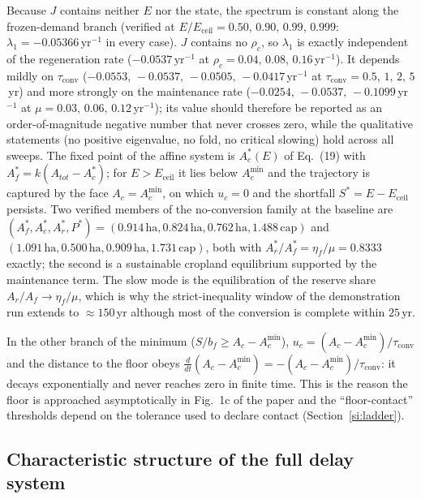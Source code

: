 \documentclass[11pt,a4paper]{article}
\newcommand{\Eceil}{E_{\mathrm{ceil}}}
\newcommand{\Acmin}{A_c^{\min}}
\newcommand{\tconv}{\tau_{\mathrm{conv}}}
\begin{document}
Because $J$ contains neither $E$ nor the state, the spectrum is constant along the frozen-demand branch (verified at $E/\Eceil=0.50,\,0.90,\,0.99,\,0.999$: $\lambda_1=-0.05366\,\mathrm{yr}^{-1}$ in every case). $J$ contains no $\rho_c$, so $\lambda_1$ is exactly independent of the regeneration rate ($-0.0537\,\mathrm{yr}^{-1}$ at $\rho_c=0.04,\,0.08,\,0.16$\,yr$^{-1}$). It depends mildly on $\tconv$ ($-0.0553,\,-0.0537,\,-0.0505,\,-0.0417$\,yr$^{-1}$ at $\tconv=0.5,\,1,\,2,\,5$\,yr) and more strongly on the maintenance rate ($-0.0254,\,-0.0537,\,-0.1099$\,yr$^{-1}$ at $\mu=0.03,\,0.06,\,0.12$\,yr$^{-1}$); its value should therefore be reported as an order-of-magnitude negative number that never crosses zero, while the qualitative statements (no positive eigenvalue, no fold, no critical slowing) hold across all sweeps. The fixed point of the affine system is $A_c^*(E)$ of Eq.~(19) with $A_f^*=k(A_{tot}-A_c^*)$; for $E>\Eceil$ it lies below $\Acmin$ and the trajectory is captured by the face $A_c=\Acmin$, on which $u_c=0$ and the shortfall $S^*=E-\Eceil$ persists. Two verified members of the no-conversion family at the baseline are $(A_f^*,A_c^*,A_r^*,P^*)=(0.914\,\mathrm{ha},0.824\,\mathrm{ha},0.762\,\mathrm{ha},1.488\,\mathrm{cap})$ and $(1.091\,\mathrm{ha},0.500\,\mathrm{ha},0.909\,\mathrm{ha},1.731\,\mathrm{cap})$, both with $A_r^*/A_f^*=\eta_f/\mu=0.8333$ exactly; the second is a sustainable cropland equilibrium supported by the maintenance term. The slow mode is the equilibration of the reserve share $A_r/A_f\to\eta_f/\mu$, which is why the strict-inequality window of the demonstration run extends to $\approx150$\,yr although most of the conversion is complete within $25$\,yr.

In the other branch of the minimum ($S/b_f\ge A_c-\Acmin$), $u_c=(A_c-\Acmin)/\tconv$ and the distance to the floor obeys $\frac{d}{dt}(A_c-\Acmin)=-(A_c-\Acmin)/\tconv$: it decays exponentially and never reaches zero in finite time. This is the reason the floor is approached asymptotically in Fig.~1c of the paper and the ``floor-contact'' thresholds depend on the tolerance used to declare contact (Section~\ref{si:ladder}).

\subsection{Characteristic structure of the full delay system}\label{si:char}
\end{document}
